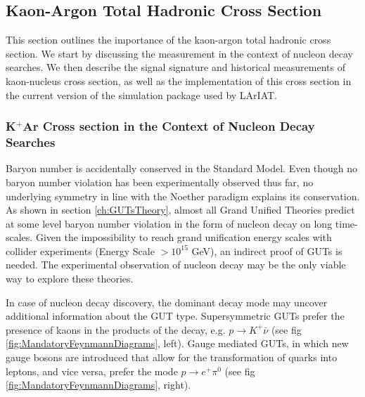 \clearpage


\subsection{Kaon-Argon Total Hadronic Cross Section}
This section outlines the importance of the kaon-argon total hadronic cross section. We start by discussing the measurement in the context of nucleon decay searches. %
 We then describe the signal signature and historical measurements of kaon-nucleus cross section, as well as the implementation of this cross section in the current version of the simulation package used by LArIAT.

\subsubsection{K$^{+}$Ar Cross section in the Context of Nucleon Decay Searches}\label{sec:theoryPDK}
Baryon number is accidentally conserved in the Standard Model. Even though no baryon number violation has been experimentally observed thus far, no underlying symmetry in line with the Noether paradigm \cite{Noether1971} explains its conservation. As shown in section \ref{ch:GUTsTheory}, almost all Grand Unified Theories predict at some level baryon number violation in the form of nucleon decay on long time-scales.  Given the impossibility to reach grand unification energy scales with collider experiments (Energy Scale $> 10^{15}$ GeV),  an indirect proof of GUTs is needed. The experimental observation of nucleon decay may be the only viable way to explore these theories. 

In case of nucleon decay discovery, the dominant decay mode may uncover additional information about the GUT type.  Supersymmetric GUTs \cite{Dimopoulos:1981dw,Bajc20161} prefer the presence of kaons in the products of the decay, e.g. $p\rightarrow K^+\bar{\nu}$  (see fig \ref{fig:MandatoryFeynmannDiagrams}, left).
Gauge mediated GUTs, in which new gauge bosons are introduced that allow for the transformation of quarks into leptons, and vice versa, prefer the mode $p\rightarrow e^+\pi^0$ (see fig \ref{fig:MandatoryFeynmannDiagrams}, right).



